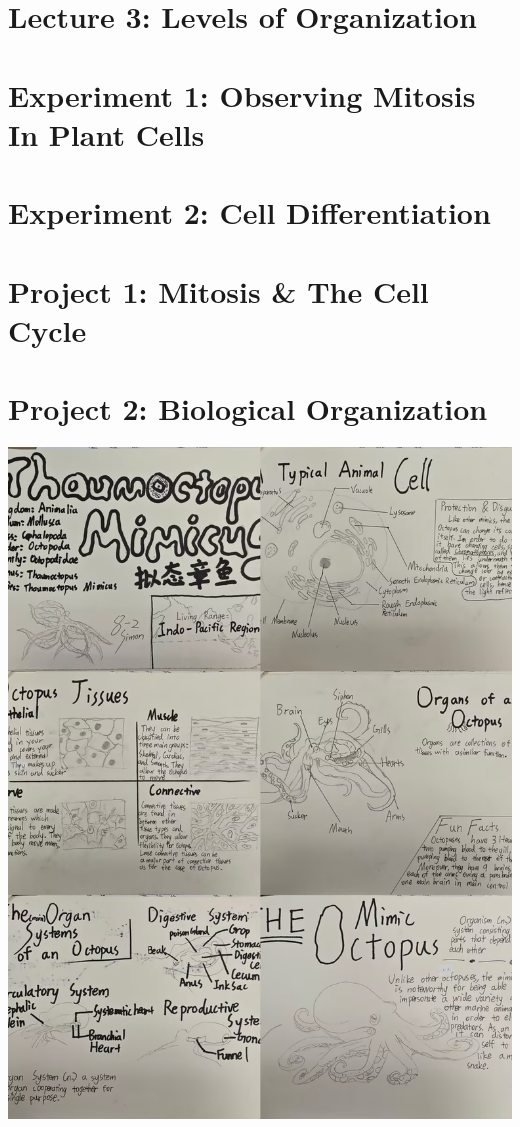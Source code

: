 \documentclass[
]{book}
\begin{document}
\hypertarget{lecture-3-levels-of-organization}{%
\section{Lecture 3: Levels of Organization}\label{lecture-3-levels-of-organization}}

\hypertarget{experiment-1-observing-mitosis-in-plant-cells}{%
\section{Experiment 1: Observing Mitosis In Plant Cells}\label{experiment-1-observing-mitosis-in-plant-cells}}

\hypertarget{experiment-2-cell-differentiation}{%
\section{Experiment 2: Cell Differentiation}\label{experiment-2-cell-differentiation}}

\hypertarget{project-1-mitosis-the-cell-cycle}{%
\section{Project 1: Mitosis \& The Cell Cycle}\label{project-1-mitosis-the-cell-cycle}}

\hypertarget{project-2-biological-organization}{%
\section{Project 2: Biological Organization}\label{project-2-biological-organization}}

\includegraphics{./img/p2-1.jpg}
\end{document}
